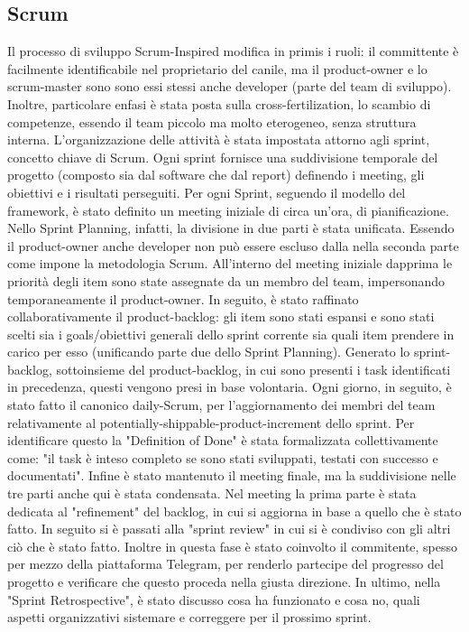     \subsection{Scrum}
    Il processo di sviluppo Scrum-Inspired modifica in primis i ruoli: il committente è facilmente identificabile nel proprietario del canile, ma il product-owner e lo scrum-master sono sono essi stessi anche developer (parte del team di sviluppo). 
    Inoltre, particolare enfasi è stata posta sulla cross-fertilization, lo scambio di competenze, essendo il team piccolo ma molto eterogeneo, senza struttura interna.
    L'organizzazione delle attività è stata impostata attorno agli sprint, concetto chiave di Scrum. Ogni sprint fornisce una suddivisione temporale del progetto (composto sia dal software che dal report) definendo i meeting, gli obiettivi e i risultati perseguiti. Per ogni Sprint, seguendo il modello del framework, è stato definito un meeting iniziale di circa un'ora, di pianificazione. 
    Nello Sprint Planning, infatti, la divisione in due parti è stata unificata. Essendo il product-owner anche developer non può essere escluso dalla nella seconda parte come impone la metodologia Scrum. 
    All'interno del meeting iniziale dapprima le priorità degli item sono state assegnate da un membro del team, impersonando temporaneamente il product-owner. In seguito, è stato raffinato collaborativamente il product-backlog: gli item sono stati espansi e sono stati scelti sia i goals/obiettivi generali dello sprint corrente sia quali item prendere in carico per esso (unificando parte due dello Sprint Planning).
    Generato lo sprint-backlog, sottoinsieme del product-backlog, in cui sono presenti i task identificati in precedenza, questi vengono presi in base volontaria. 
    Ogni giorno, in seguito, è stato fatto il canonico daily-Scrum, per l'aggiornamento dei membri del team relativamente al potentially-shippable-product-increment dello sprint.
    Per identificare questo la "Definition of Done" è stata formalizzata collettivamente come: "il task è inteso completo se sono stati sviluppati, testati con successo e documentati".
    Infine è stato mantenuto il meeting finale, ma la suddivisione nelle tre parti anche qui è stata condensata. 
    Nel meeting la prima parte è stata dedicata al "refinement" del backlog, in cui si aggiorna in base a quello che è stato fatto. In seguito si è passati alla "sprint review" in cui si è condiviso con gli altri ciò che è stato fatto. Inoltre in questa fase è stato coinvolto il commitente, spesso per mezzo della piattaforma Telegram, per renderlo partecipe del progresso del progetto e verificare che questo proceda nella giusta direzione. In ultimo, nella "Sprint Retrospective", è stato discusso cosa ha funzionato e cosa no, quali aspetti organizzativi sistemare e correggere per il prossimo sprint. 
    
